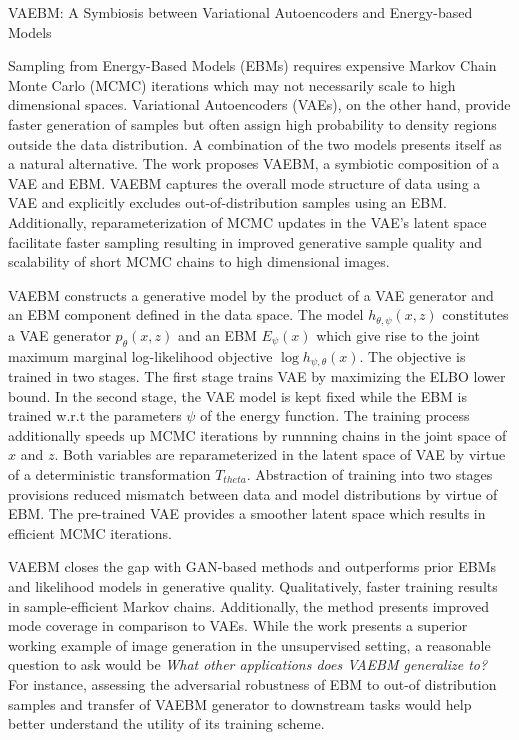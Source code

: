 \documentclass[12pt,letterpaper]{article}
\begin{document}
\begin{center}
  \large{VAEBM: A Symbiosis between Variational Autoencoders and Energy-based Models}
\end{center}

Sampling from Energy-Based Models (EBMs) requires expensive Markov Chain Monte Carlo (MCMC) iterations which may not necessarily scale to high dimensional spaces. Variational Autoencoders (VAEs), on the other hand, provide faster generation of samples but often assign high probability to density regions outside the data distribution. A combination of the two models presents itself as a natural alternative. The work proposes VAEBM, a symbiotic composition of a VAE and EBM. VAEBM captures the overall mode structure of data using a VAE and explicitly excludes out-of-distribution samples using an EBM. Additionally, reparameterization of MCMC updates in the VAE's latent space facilitate faster sampling resulting in improved generative sample quality and scalability of short MCMC chains to high dimensional images.

VAEBM constructs a generative model by the product of a VAE generator and an EBM component defined in the data space. The model $h_{\theta,\psi}(x,z)$ constitutes a VAE generator $p_{\theta}(x,z)$ and an EBM $E_{\psi}(x)$ which give rise to the joint maximum marginal log-likelihood objective $\log h_{\psi,\theta}(x)$. The objective is trained in two stages. The first stage trains VAE by maximizing the ELBO lower bound. In the second stage, the VAE model is kept fixed while the EBM is trained w.r.t the parameters $\psi$ of the energy function. The training process additionally speeds up MCMC iterations by runnning chains in the joint space of $x$ and $z$. Both variables are reparameterized in the latent space of VAE by virtue of a deterministic transformation $T_{theta}$. Abstraction of training into two stages provisions reduced mismatch between data and model distributions by virtue of EBM. The pre-trained VAE provides a smoother latent space which results in efficient MCMC iterations. 

VAEBM closes the gap with GAN-based methods and outperforms prior EBMs and likelihood models in generative quality. Qualitatively, faster training results in sample-efficient Markov chains. Additionally, the method presents improved mode coverage in comparison to VAEs. While the work presents a superior working example of image generation in the unsupervised setting, a reasonable question to ask would be \textit{What other applications does VAEBM generalize to?} For instance, assessing the adversarial robustness of EBM to out-of distribution samples and transfer of VAEBM generator to downstream tasks would help better understand the utility of its training scheme.
\end{document}
